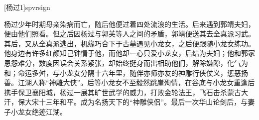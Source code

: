\documentclass[doctor, vlined]{DissertUESTC}
\begin{document}

	[杨过1]{spvrsign}

	
	
	\zhabstract
	
	杨过少年时期母亲染病而亡，随后他便过着四处流浪的生活。后来遇到郭靖夫妇，便由他们照看。但之后因杨过与郭芙等人之间的矛盾，郭靖便送其去全真派习武。其后，又从全真派逃出，机缘巧合下于古墓遇见小龙女，之后便跟随小龙女练功。他身边有许多红颜知己钟情于他，而他却一心只爱小龙女，后结为夫妇；他和郭家恩怨难分，数度因误会关系紧张，却始终挺身而出相助他们，解除嫌隙，化气为和；命运多舛，与小龙女分隔十六年里，随伴亦师亦友的神雕行侠仗义，惩恶扬善。江湖人称“神雕大侠”。后等小龙女不至毅然跳崖殉情，在谷底与小龙女重逢后携手保卫襄阳城，杨过一展其旷世武学的威力，打败金轮法王，飞石击杀蒙古大汗，保大宋十三年和平。成为名扬天下的“神雕侠侣”。最后一次华山论剑后，与妻子小龙女绝迹江湖。




\end{document}

